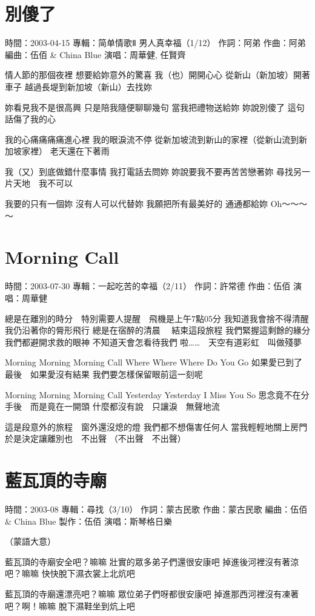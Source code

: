 \documentclass[UTF8,a4paper,oneside,twocolumn,12pt]{ctexbook}
\newcommand{\infopair}[2]{\textbullet #1：#2}
\newcommand{\zc}[1][伍佰]{\infopair{作詞}{#1}}
\newcommand{\zq}[1][伍佰]{\infopair{作曲}{#1}}
\newcommand{\bq}[1][伍佰]{\infopair{編曲}{#1}}
\newcommand{\zj}[1]{\infopair{專輯}{#1}}
\newcommand{\zz}[1]{\infopair{製作}{#1}}
\newcommand{\sj}[1]{\infopair{時間}{#1}}
\newenvironment{info}{\begin{flushleft}\kaishu
	}
	{\end{flushleft}\normalsize\yahei\par}
\newenvironment{lyric}{
	}
{}
\begin{document}
\section{別傻了}
\begin{info}
	\sj{2003-04-15}
	\zj{简单情歌Ⅱ 男人真幸福（1/12）}
	\zc[阿弟]
	\zq[阿弟]
	\bq[伍佰 \& China Blue]
	\infopair{演唱}{周華健, 任賢齊}
\end{info}
\begin{lyric}
	情人節的那個夜裡
	想要給妳意外的驚喜
	我（也）開開心心 從新山（新加坡）開著車子
	越過長堤到新加坡（新山）去找妳

	妳看見我不是很高興
	只是陪我隨便聊聊幾句
	當我把禮物送給妳
	妳說別傻了
	這句話傷了我的心

	我的心痛痛痛痛進心裡
	我的眼淚流不停
	從新加坡流到新山的家裡（從新山流到新加坡家裡）
	老天還在下著雨

	我（又）到底做錯什麼事情
	我打電話去問妳
	妳說要我不要再苦苦戀著妳
	尋找另一片天地　我不可以

	我要的只有一個妳 沒有人可以代替妳
	我願把所有最美好的 通通都給妳
	Oh～～～～
\end{lyric}

\section{Morning Call}
\begin{info}
	\sj{2003-07-30}
	\zj{一起吃苦的幸福（2/11）}
	\zc[許常德]
	\zq
	\infopair{演唱}{周華健}
\end{info}
\begin{lyric}
	總是在離別的時分　特別需要人提醒　飛機是上午7點05分
	我知道我會捨不得清醒　我仍沿著你的脣形飛行
	總是在宿醉的清晨 　結束這段旅程
	我們緊握這剩餘的緣分　我們都避開求救的眼神
	不知道天會怎看待我們
	啦……　天空有道彩虹　叫做殘夢

	Morning Morning Morning Call
	Where Where Where Do You Go
	如果愛已到了最後　如果愛沒有結果
	我們要怎樣保留眼前這一刻呢

	Morning Morning Morning Call
	Yesterday Yesterday I Miss You So
	思念竟不在分手後　而是竟在一開頭
	什麼都沒有說　只讓淚　無聲地流

	這是段意外的旅程　窗外還沒熄的燈
	我們都不想傷害任何人
	當我輕輕地關上房門　於是決定讓離別也　不出聲
	（不出聲　不出聲）
\end{lyric}

\section{藍瓦頂的寺廟}
\begin{info}
	\sj{2003-08}
	\zj{尋找（3/10）}
	\zc[蒙古民歌]
	\zq[蒙古民歌]
	\bq[伍佰 \& China Blue]
	\zz{伍佰}
	\infopair{演唱}{斯琴格日樂}
\end{info}
\begin{lyric}
	（蒙語大意）

	藍瓦頂的寺廟安全吧？嘛嘛
	壯實的眾多弟子們還很安康吧
	掉進後河裡沒有著涼吧？嘛嘛
	快快脫下濕衣裳上北炕吧

	藍瓦頂的寺廟還漂亮吧？嘛嘛
	眾位弟子們呀都很安康吧
	掉進那西河裡沒有凍著吧？啊！嘛嘛
	脫下濕鞋坐到炕上吧
\end{lyric}
\end{document}
